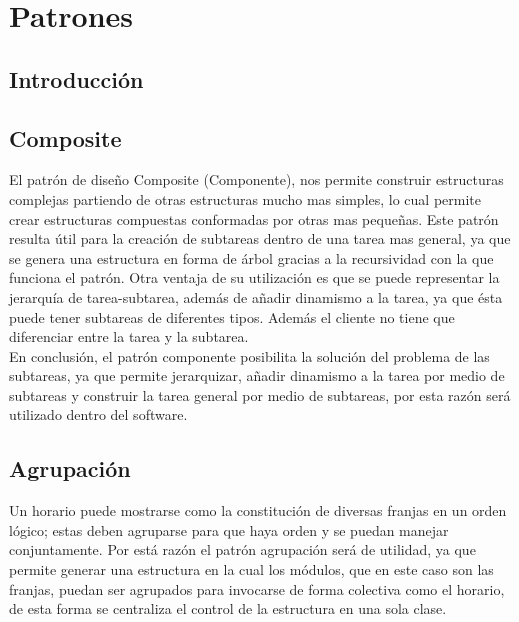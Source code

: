 \chapter{Patrones}
\section{Introducción}

\newpage

\section{Composite}
El patrón de diseño Composite (Componente), nos permite construir estructuras complejas partiendo de otras estructuras mucho mas simples, lo cual permite crear estructuras compuestas conformadas por otras mas pequeñas. Este patrón resulta útil para la creación de subtareas dentro de una tarea mas general, ya que se genera una estructura en forma de árbol gracias a la recursividad con la que funciona el patrón. Otra ventaja de su utilización es que se puede representar la jerarquía de tarea-subtarea, además de añadir dinamismo a la tarea, ya que ésta puede tener subtareas de diferentes tipos. Además el cliente no tiene que diferenciar entre la tarea y la subtarea.
\\
En conclusión, el patrón componente posibilita la solución del problema de las subtareas, ya que permite jerarquizar, añadir dinamismo a la tarea por medio de subtareas y construir la tarea general por medio de subtareas, por esta razón será utilizado dentro del software.

\section{Agrupación}
Un horario puede mostrarse como la constitución de diversas franjas en un orden lógico; estas deben agruparse para que haya orden y se puedan manejar conjuntamente. Por está razón el patrón agrupación será de utilidad, ya que permite generar una estructura en la cual los módulos, que en este caso son las franjas, puedan ser agrupados para invocarse de forma colectiva como el horario, de esta forma se centraliza el control de la estructura en una sola clase.
